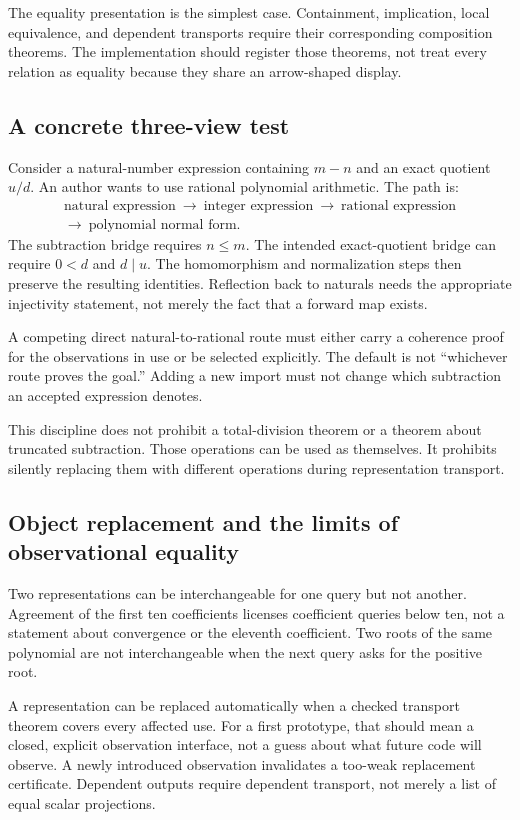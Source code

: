 \documentclass[11pt,a4paper]{article}
\theoremstyle{definition}
\begin{document}
The equality presentation is the simplest case. Containment, implication, local equivalence, and dependent transports require their corresponding composition theorems. The implementation should register those theorems, not treat every relation as equality because they share an arrow-shaped display.

\subsection{A concrete three-view test}
Consider a natural-number expression containing \(m-n\) and an exact quotient \(u/d\). An author wants to use rational polynomial arithmetic. The path is:
\[
  \begin{gathered}
  \text{natural expression}\ \longrightarrow\
  \text{integer expression}\ \longrightarrow\
  \text{rational expression}\\
  \longrightarrow\ \text{polynomial normal form}.
  \end{gathered}
\]
The subtraction bridge requires \(n\le m\). The intended exact-quotient bridge can require \(0<d\) and \(d\mid u\). The homomorphism and normalization steps then preserve the resulting identities. Reflection back to naturals needs the appropriate injectivity statement, not merely the fact that a forward map exists.

A competing direct natural-to-rational route must either carry a coherence proof for the observations in use or be selected explicitly. The default is not ``whichever route proves the goal.'' Adding a new import must not change which subtraction an accepted expression denotes.

This discipline does not prohibit a total-division theorem or a theorem about truncated subtraction. Those operations can be used as themselves. It prohibits silently replacing them with different operations during representation transport.

\subsection{Object replacement and the limits of observational equality}
Two representations can be interchangeable for one query but not another. Agreement of the first ten coefficients licenses coefficient queries below ten, not a statement about convergence or the eleventh coefficient. Two roots of the same polynomial are not interchangeable when the next query asks for the positive root.

A representation can be replaced automatically when a checked transport theorem covers every affected use. For a first prototype, that should mean a closed, explicit observation interface, not a guess about what future code will observe. A newly introduced observation invalidates a too-weak replacement certificate. Dependent outputs require dependent transport, not merely a list of equal scalar projections.
\end{document}
